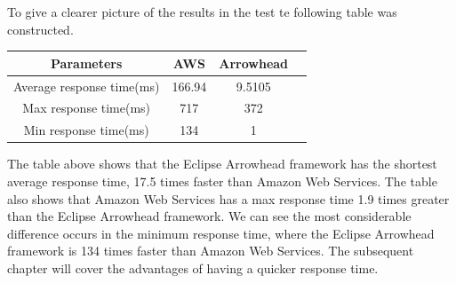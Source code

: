 To give a clearer picture of the results in the test te following table was constructed. 
\begin{center}
    \begin{tabular}{||c|c|c|c||}
        \hline
        Parameters & AWS & Arrowhead \\
        \hline\hline
        Average response time(ms) & 166.94 & 9.5105 \\
        Max response time(ms) & 717 & 372 \\
        Min response time(ms) & 134 & 1 \\
        \hline
    \end{tabular}
\end{center}
The table above shows that the Eclipse Arrowhead framework has the shortest average response time, 17.5 times faster than Amazon Web Services. 
The table also shows that Amazon Web Services has a max response time  1.9 times greater than the Eclipse Arrowhead framework.
We can see the most considerable difference occurs in the minimum response time, where the Eclipse Arrowhead framework is 134 times faster than Amazon Web Services.
The subsequent chapter will cover the advantages of having a quicker response time.


